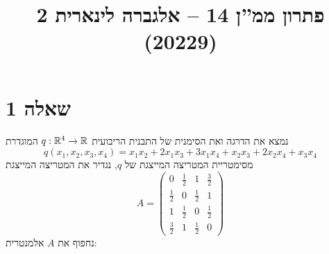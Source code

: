 
\title{פתרון ממ''ן 14 – אלגברה לינארית 2 (20229)}


\maketitle

\section{שאלה 1}
נמצא את הדרגה ואת הסימנית של התבנית הריבועית $q : \mathbb{R}^4 \to \mathbb{R}$ המוגדרת
\[
	q(x_1, x_2, x_3, x_4) = x_1 x_2 + 2x_1 x_3 + 3x_1 x_4 + x_2 x_3 + 2x_2 x_4 + x_3 x_4
\]
מסימטריית המטריצה המייצגת של $q$, נגדיר את המטריצה המייצגת
\[
	A = \begin{pmatrix}
		0 & \frac{1}{2} & 1 & \frac{3}{2} \\
		\frac{1}{2} & 0 & \frac{1}{2} & 1 \\
		1 & \frac{1}{2} & 0 & \frac{1}{2} \\
		\frac{3}{2} & 1 & \frac{1}{2} & 0
	\end{pmatrix}
\]
נחפוף את $A$ אלמנטרית:

